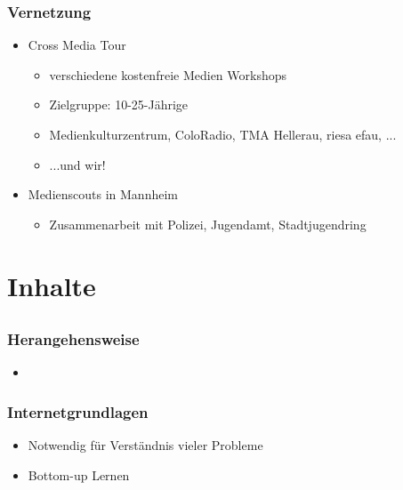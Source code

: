\documentclass[12pt]{beamer}
\begin{document}
\begin{frame}
  \frametitle{Vernetzung}
  \begin{itemize}
    \item<2-> Cross Media Tour
    \begin{itemize}
      \item<3-> verschiedene kostenfreie Medien Workshops
      \item<4-> Zielgruppe: 10-25-Jährige
      \item<5-> Medienkulturzentrum, ColoRadio, TMA Hellerau, riesa efau, ...
      \item<6-> ...und wir!
    \end{itemize}
    \item<7-> Medienscouts in Mannheim
    \begin{itemize}
      \item<7-> Zusammenarbeit mit Polizei, Jugendamt, Stadtjugendring
    \end{itemize}
  \end{itemize}
\end{frame}

\section{Inhalte}
\subsection{}

\begin{frame}
  \frametitle{Herangehensweise}
  \begin{itemize}
    \item<2-> 
  \end{itemize}
\end{frame}

\begin{frame}
  \frametitle{Internetgrundlagen}
  \begin{itemize}
    \item Notwendig für Verständnis vieler Probleme
    \item Bottom-up Lernen
  \end{itemize}
\end{frame}
\end{document}
